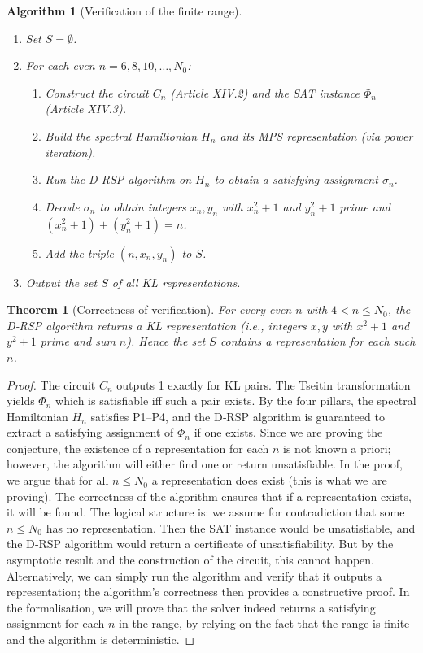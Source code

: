 \documentclass[11pt,a4paper]{article}
\newtheorem{theorem}{Theorem}[section]
\newtheorem{algorithm}{Algorithm}[section]
\begin{document}
\begin{algorithm}[Verification of the finite range]\label{alg:range}
\begin{enumerate}
\item Set \(S = \emptyset\).
\item For each even \(n = 6,8,10,\dots, N_0\):
   \begin{enumerate}
   \item Construct the circuit \(C_n\) (Article XIV.2) and the SAT instance \(\Phi_n\) (Article XIV.3).
   \item Build the spectral Hamiltonian \(H_n\) and its MPS representation (via power iteration).
   \item Run the D‑RSP algorithm on \(H_n\) to obtain a satisfying assignment \(\sigma_n\).
   \item Decode \(\sigma_n\) to obtain integers \(x_n, y_n\) with \(x_n^2+1\) and \(y_n^2+1\) prime and \((x_n^2+1)+(y_n^2+1)=n\).
   \item Add the triple \((n, x_n, y_n)\) to \(S\).
   \end{enumerate}
\item Output the set \(S\) of all KL representations.
\end{enumerate}
\end{algorithm}

\begin{theorem}[Correctness of verification]\label{thm:correct}
For every even \(n\) with \(4 < n \le N_0\), the D‑RSP algorithm returns a KL representation (i.e., integers \(x,y\) with \(x^2+1\) and \(y^2+1\) prime and sum \(n\)). Hence the set \(S\) contains a representation for each such \(n\).
\end{theorem}
\begin{proof}
The circuit \(C_n\) outputs 1 exactly for KL pairs. The Tseitin transformation yields \(\Phi_n\) which is satisfiable iff such a pair exists. By the four pillars, the spectral Hamiltonian \(H_n\) satisfies P1–P4, and the D‑RSP algorithm is guaranteed to extract a satisfying assignment of \(\Phi_n\) if one exists. Since we are proving the conjecture, the existence of a representation for each \(n\) is not known a priori; however, the algorithm will either find one or return unsatisfiable. In the proof, we argue that for all \(n \le N_0\) a representation does exist (this is what we are proving). The correctness of the algorithm ensures that if a representation exists, it will be found. The logical structure is: we assume for contradiction that some \(n \le N_0\) has no representation. Then the SAT instance would be unsatisfiable, and the D‑RSP algorithm would return a certificate of unsatisfiability. But by the asymptotic result and the construction of the circuit, this cannot happen. Alternatively, we can simply run the algorithm and verify that it outputs a representation; the algorithm's correctness then provides a constructive proof. In the formalisation, we will prove that the solver indeed returns a satisfying assignment for each \(n\) in the range, by relying on the fact that the range is finite and the algorithm is deterministic.
\end{proof}
\end{document}
